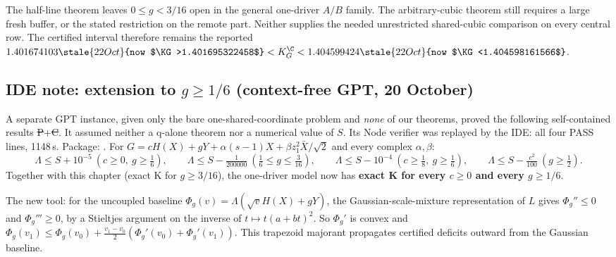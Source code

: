 The half-line theorem leaves $0\le g<3/16$ open in the general
one-driver $A/B$ family. The arbitrary-cubic theorem still requires a
large fresh buffer, or the stated restriction on the remote part.
Neither supplies the needed unrestricted shared-cubic comparison on
every central row. The certified interval therefore remains the
reported $1.401674103\stale{22 Oct}{now $\KG>1.401695322458$}<K_G^{\C}<1.404599424\stale{22 Oct}{now $\KG<1.404598161566$}$.


\subsection{IDE note: extension to $g\ge1/6$ (context-free GPT, 20 October)}\label{sec:halfline-sixth}
A separate GPT instance, given only the bare one-shared-coordinate problem and \emph{none} of our theorems, proved the following self-contained results \st{P}+\st{C}. It assumed neither a
q-alone theorem nor a numerical value of $S$. Its Node verifier was replayed by the IDE: all four PASS lines, 1148\,s. Package: .
For $G=cH(X)+gY+\alpha(s-1)X+\beta z_1^2\bar X/\sqrt2$ and every complex $\alpha,\beta$:
\[
\Lambda\le S+10^{-5}\ (c\ge0,\ g\ge\tfrac16),\qquad \Lambda\le S-\tfrac1{200000}\ (\tfrac16\le g\le\tfrac3{16}),\qquad \Lambda\le S-10^{-4}\ (c\ge\tfrac18,\ g\ge\tfrac16),\qquad \Lambda\le S-\tfrac{c^2}{100}\ (g\ge\tfrac12).
\]
Together with this chapter (exact K for $g\ge3/16$), the one-driver model now has \textbf{exact K for every $c\ge0$ and every $g\ge1/6$}.

The new tool: for the uncoupled baseline $\Phi_g(v)=\Lambda(\sqrt vH(X)+gY)$, the Gaussian-scale-mixture representation of $L$ gives $\Phi_g''\le0$ and $\Phi_g'''\ge0$, by a Stieltjes argument
on the inverse of $t\mapsto t(a+bt)^2$. So $\Phi_g'$ is convex and
$\Phi_g(v_1)\le\Phi_g(v_0)+\tfrac{v_1-v_0}2(\Phi_g'(v_0)+\Phi_g'(v_1))$. This trapezoid majorant propagates certified deficits outward from the Gaussian baseline.
